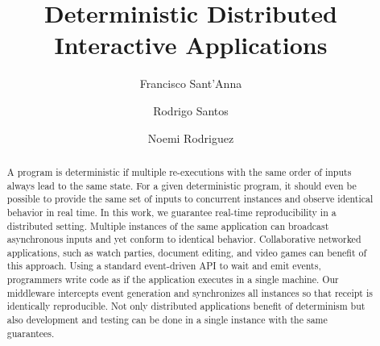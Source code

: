 \documentclass[sigplan,screen]{acmart}
\begin{document}
\title{Deterministic Distributed Interactive Applications}

\author{Francisco Sant'Anna}

\author{Rodrigo Santos}

\author{Noemi Rodriguez}


\begin{abstract}
A program is deterministic if multiple re-executions with the same order of
inputs always lead to the same state.
For a given deterministic program, it should even be possible to provide the
same set of inputs to concurrent instances and observe identical behavior in
real time.
%
In this work, we guarantee real-time reproducibility in a distributed setting.
Multiple instances of the same application can broadcast asynchronous inputs
and yet conform to identical behavior.
Collaborative networked applications, such as watch parties, document editing,
and video games can benefit of this approach.
%
Using a standard event-driven API to wait and emit events, programmers write
code as if the application executes in a single machine.
Our middleware intercepts event generation and synchronizes all instances so
that receipt is identically reproducible.
Not only distributed applications benefit of determinism but also development
and testing can be done in a single instance with the same guarantees.
\end{abstract}

\maketitle
\end{document}
